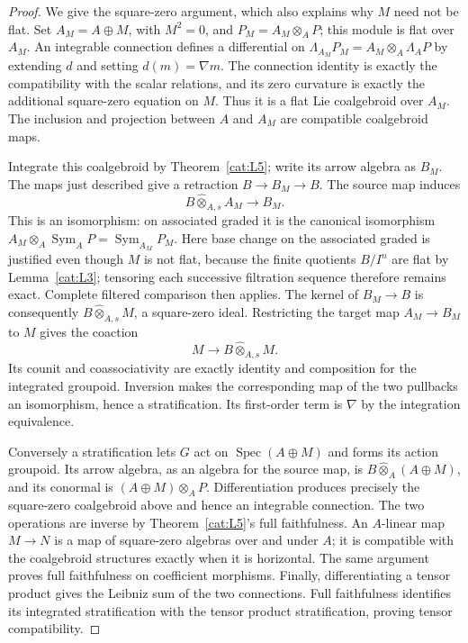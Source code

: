 \begin{proof}
We give the square-zero argument, which also explains why $M$ need
not be flat.  Set $A_M=A\oplus M$, with $M^2=0$, and
$P_M=A_M\otimes_A P$; this module is flat over $A_M$.
An integrable connection defines a differential on
$\Lambda_{A_M}P_M=A_M\otimes_A\Lambda_AP$ by extending $d$ and
setting $d(m)=\nabla m$.  The connection identity is exactly the
compatibility with the scalar relations, and its zero curvature is
exactly the additional square-zero equation on $M$.
Thus it is a flat Lie coalgebroid over $A_M$.  The inclusion and
projection between $A$ and $A_M$ are compatible coalgebroid maps.

Integrate this coalgebroid by Theorem~\ref{cat:L5}; write its arrow
algebra as $B_M$.  The maps just described give a retraction
$B\to B_M\to B$.  The source map induces
\[
 B\widehat\otimes_{A,s}A_M\longrightarrow B_M.
\]
This is an isomorphism: on associated graded it is the canonical
isomorphism
$A_M\otimes_A\operatorname{Sym}_AP
 =\operatorname{Sym}_{A_M}P_M$.
Here base change on the associated graded is justified even though
$M$ is not flat, because the finite quotients $B/I^n$ are flat by
Lemma~\ref{cat:L3}; tensoring each successive filtration sequence
therefore remains exact.  Complete filtered comparison then applies.
The kernel of $B_M\to B$ is consequently
$B\widehat\otimes_{A,s}M$, a square-zero ideal.
Restricting the target map $A_M\to B_M$ to $M$ gives the coaction
\[
 M\longrightarrow B\widehat\otimes_{A,s}M.
\]
Its counit and coassociativity are exactly identity and composition
for the integrated groupoid.  Inversion makes the corresponding map
of the two pullbacks an isomorphism, hence a stratification.
Its first-order term is $\nabla$ by the integration equivalence.

Conversely a stratification lets $G$ act on
$\operatorname{Spec}(A\oplus M)$ and forms its action groupoid.
Its arrow algebra, as an algebra for the source map, is
$B\widehat\otimes_A(A\oplus M)$, and its conormal is
$(A\oplus M)\otimes_AP$.  Differentiation produces precisely the
square-zero coalgebroid above and hence an integrable connection.
The two operations are inverse by Theorem~\ref{cat:L5}'s full
faithfulness.  An $A$-linear map $M\to N$ is a map of square-zero
algebras over and under $A$; it is compatible with the coalgebroid
structures exactly when it is horizontal.  The same argument proves
full faithfulness on coefficient morphisms.  Finally, differentiating
a tensor product gives the Leibniz sum of the two connections.  Full
faithfulness identifies its integrated stratification with the tensor
product stratification, proving tensor compatibility.
\end{proof}

